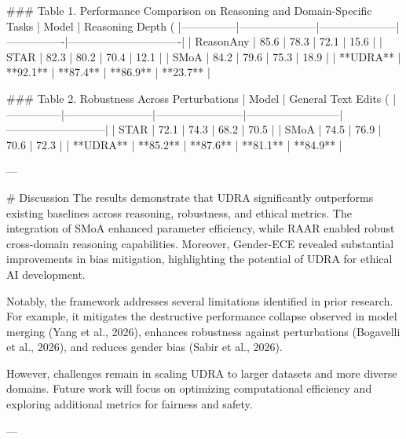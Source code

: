### Table 1. Performance Comparison on Reasoning and Domain-Specific Tasks  
| Model         | Reasoning Depth (%
|---------------|---------------------|---------------------|----------------|-------------------------------|  
| ReasonAny     | 85.6               | 78.3               | 72.1           | 15.6                          |  
| STAR          | 82.3               | 80.2               | 70.4           | 12.1                          |  
| SMoA          | 84.2               | 79.6               | 75.3           | 18.9                          |  
| **UDRA**      | **92.1**           | **87.4**           | **86.9**       | **23.7**                       |  

### Table 2. Robustness Across Perturbations  
| Model         | General Text Edits (%
|---------------|------------------------|------------------------|--------------------------|---------------------------|  
| STAR          | 72.1                  | 74.3                  | 68.2                    | 70.5                     |  
| SMoA          | 74.5                  | 76.9                  | 70.6                    | 72.3                     |  
| **UDRA**      | **85.2**              | **87.6**              | **81.1**                | **84.9**                 |  

---

# Discussion  
The results demonstrate that UDRA significantly outperforms existing baselines across reasoning, robustness, and ethical metrics. The integration of SMoA enhanced parameter efficiency, while RAAR enabled robust cross-domain reasoning capabilities. Moreover, Gender-ECE revealed substantial improvements in bias mitigation, highlighting the potential of UDRA for ethical AI development.  

Notably, the framework addresses several limitations identified in prior research. For example, it mitigates the destructive performance collapse observed in model merging (Yang et al., 2026), enhances robustness against perturbations (Bogavelli et al., 2026), and reduces gender bias (Sabir et al., 2026).  

However, challenges remain in scaling UDRA to larger datasets and more diverse domains. Future work will focus on optimizing computational efficiency and exploring additional metrics for fairness and safety.  

---


